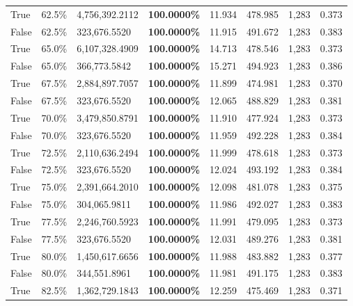 \begin{table}[H]
\begin{tabular}{lllrllll}
\cline{1-8}
True & 62.5\% & 4,756,392.2112 & \bfseries \color{red} 100.0000\% & 11.934 & 478.985 & 1,283 & 0.373 \\
\cline{1-8}
False & 62.5\% & 323,676.5520 & \bfseries \color{red} 100.0000\% & 11.915 & 491.672 & 1,283 & 0.383 \\
\cline{1-8}
True & 65.0\% & 6,107,328.4909 & \bfseries \color{red} 100.0000\% & 14.713 & 478.546 & 1,283 & 0.373 \\
\cline{1-8}
False & 65.0\% & 366,773.5842 & \bfseries \color{red} 100.0000\% & 15.271 & 494.923 & 1,283 & 0.386 \\
\cline{1-8}
True & 67.5\% & 2,884,897.7057 & \bfseries \color{red} 100.0000\% & 11.899 & 474.981 & 1,283 & 0.370 \\
\cline{1-8}
False & 67.5\% & 323,676.5520 & \bfseries \color{red} 100.0000\% & 12.065 & 488.829 & 1,283 & 0.381 \\
\cline{1-8}
True & 70.0\% & 3,479,850.8791 & \bfseries \color{red} 100.0000\% & 11.910 & 477.924 & 1,283 & 0.373 \\
\cline{1-8}
False & 70.0\% & 323,676.5520 & \bfseries \color{red} 100.0000\% & 11.959 & 492.228 & 1,283 & 0.384 \\
\cline{1-8}
True & 72.5\% & 2,110,636.2494 & \bfseries \color{red} 100.0000\% & 11.999 & 478.618 & 1,283 & 0.373 \\
\cline{1-8}
False & 72.5\% & 323,676.5520 & \bfseries \color{red} 100.0000\% & 12.024 & 493.192 & 1,283 & 0.384 \\
\cline{1-8}
True & 75.0\% & 2,391,664.2010 & \bfseries \color{red} 100.0000\% & 12.098 & 481.078 & 1,283 & 0.375 \\
\cline{1-8}
False & 75.0\% & \color{red} 304,065.9811 & \bfseries \color{red} 100.0000\% & 11.986 & 492.027 & 1,283 & 0.383 \\
\cline{1-8}
True & 77.5\% & 2,246,760.5923 & \bfseries \color{red} 100.0000\% & 11.991 & 479.095 & 1,283 & 0.373 \\
\cline{1-8}
False & 77.5\% & 323,676.5520 & \bfseries \color{red} 100.0000\% & 12.031 & 489.276 & 1,283 & 0.381 \\
\cline{1-8}
True & 80.0\% & 1,450,617.6656 & \bfseries \color{red} 100.0000\% & 11.988 & 483.882 & 1,283 & 0.377 \\
\cline{1-8}
False & 80.0\% & 344,551.8961 & \bfseries \color{red} 100.0000\% & 11.981 & 491.175 & 1,283 & 0.383 \\
\cline{1-8}
True & 82.5\% & 1,362,729.1843 & \bfseries \color{red} 100.0000\% & 12.259 & 475.469 & 1,283 & 0.371 \\

\end{tabular}
\end{table}
